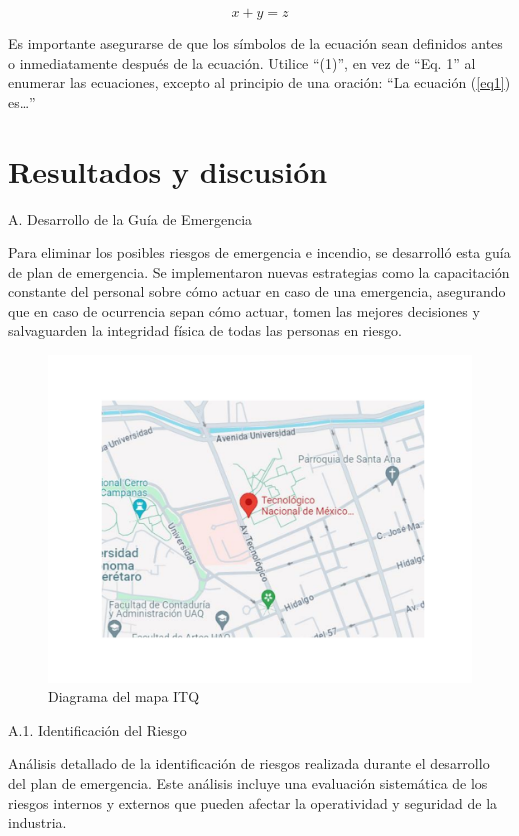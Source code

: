     \begin{equation}
        \label{eq1}
        x + y = z 
    \end{equation}
    
    Es importante asegurarse de que los símbolos de la ecuación sean definidos antes o inmediatamente después de la ecuación. Utilice “(1)”, en vez de “Eq. 1” al enumerar las ecuaciones, excepto al principio de una oración: “La ecuación (\ref{eq1}) es…”
    
    \section{Resultados y discusión}
    A. Desarrollo de la Guía de Emergencia
    
    Para eliminar los posibles riesgos de emergencia e incendio, se desarrolló esta guía de plan de emergencia. Se implementaron nuevas estrategias como la capacitación constante del personal sobre cómo actuar en caso de una emergencia, asegurando que en caso de ocurrencia sepan cómo actuar, tomen las mejores decisiones y salvaguarden la integridad física de todas las personas en riesgo.
    
    \begin{figure}[H]
        \centering
        \includegraphics[scale=0.9]{14/Img/mapaItq.pdf}
        \caption{Diagrama del mapa ITQ}
    \end{figure}
    
    A.1. Identificación del Riesgo
    
    Análisis detallado de la identificación de riesgos realizada durante el desarrollo del plan de emergencia. Este análisis incluye una evaluación sistemática de los riesgos internos y externos que pueden afectar la operatividad y seguridad de la industria.
    
